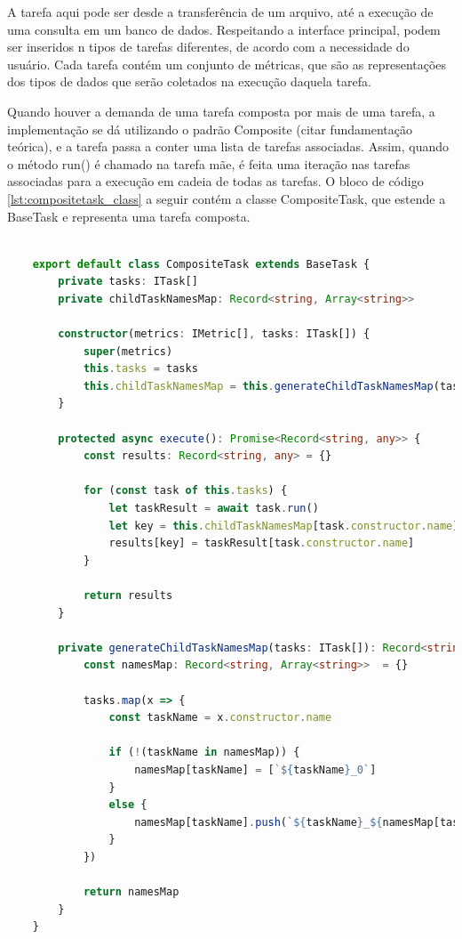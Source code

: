 \documentclass[12pt]{tcc}
\begin{document}
	A tarefa aqui pode ser desde a transferência de um arquivo, até a execução de uma consulta em um banco de dados. Respeitando a interface principal, podem ser inseridos n tipos de tarefas diferentes, de acordo com a necessidade do usuário. Cada tarefa contém um conjunto de métricas, que são as representações dos tipos de dados que serão coletados na execução daquela tarefa.

	Quando houver a demanda de uma tarefa composta por mais de uma tarefa, a implementação se dá utilizando o padrão Composite (citar fundamentação teórica), e a tarefa passa a conter uma lista de tarefas associadas. Assim, quando o método run() é chamado na tarefa mãe, é feita uma iteração nas tarefas associadas para a execução em cadeia de todas as tarefas. O bloco de código \ref{lst:compositetask_class} a seguir contém a classe CompositeTask, que estende a BaseTask e representa uma tarefa composta.

	\begin{lstlisting}[label={lst:compositetask_class}, caption={Implementação da classe responsável por representar uma tarefa composta.}, language=TypeScript, breaklines=true]

	export default class CompositeTask extends BaseTask {
		private tasks: ITask[]
		private childTaskNamesMap: Record<string, Array<string>>

		constructor(metrics: IMetric[], tasks: ITask[]) {
			super(metrics)
			this.tasks = tasks
			this.childTaskNamesMap = this.generateChildTaskNamesMap(tasks)
		}

		protected async execute(): Promise<Record<string, any>> {
			const results: Record<string, any> = {}

			for (const task of this.tasks) {
				let taskResult = await task.run()
				let key = this.childTaskNamesMap[task.constructor.name].shift() || task.constructor.name
				results[key] = taskResult[task.constructor.name]
			}

			return results
		}

		private generateChildTaskNamesMap(tasks: ITask[]): Record<string, Array<string>> {
			const namesMap: Record<string, Array<string>>  = {}

			tasks.map(x => {
				const taskName = x.constructor.name

				if (!(taskName in namesMap)) {
					namesMap[taskName] = [`${taskName}_0`]
				}
				else {
					namesMap[taskName].push(`${taskName}_${namesMap[taskName].length}`)
				}
			})
			
			return namesMap
		}
	}

	\end{lstlisting}
\end{document}

